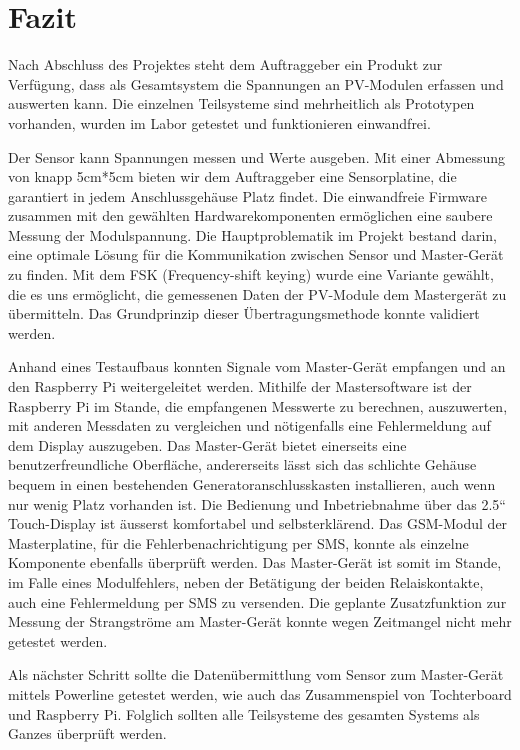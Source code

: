 \chapter{Fazit}
\label{chap:fazit}

Nach  Abschluss  des   Projektes  steht  dem  Auftraggeber   ein  Produkt  zur
Verf\"ugung, dass als  Gesamtsystem die Spannungen an  PV-Modulen erfassen und
auswerten  kann. Die einzelnen  Teilsysteme sind  mehrheitlich als  Prototypen
vorhanden, wurden im Labor getestet und funktionieren einwandfrei.

Der Sensor kann Spannungen messen  und Werte ausgeben. Mit einer Abmessung von
knapp 5cm*5cm bieten  wir dem Auftraggeber eine  Sensorplatine, die garantiert
in jedem  Anschlussgeh\"ause Platz findet. Die einwandfreie  Firmware zusammen
mit den gew\"ahlten Hardwarekomponenten erm\"oglichen eine saubere Messung der
Modulspannung. Die Hauptproblematik  im Projekt  bestand darin,  eine optimale
L\"osung  f\"ur  die  Kommunikation  zwischen  Sensor  und  Master-Ger\"at  zu
finden. Mit dem  FSK (Frequency-shift  keying) wurde eine  Variante gew\"ahlt,
die es uns erm\"oglicht, die  gemessenen Daten der PV-Module dem Masterger\"at
zu   \"ubermitteln. Das  Grundprinzip   dieser  \"Ubertragungsmethode   konnte
validiert werden.

Anhand  eines Testaufbaus  konnten  Signale vom  Master-Ger\"at empfangen  und
an  den  Raspberry  Pi   weitergeleitet  werden. Mithilfe  der  Mastersoftware
ist  der Raspberry  Pi  im  Stande, die  empfangenen  Messwerte zu  berechnen,
auszuwerten,  mit   anderen  Messdaten   zu  vergleichen   und  n\"otigenfalls
eine  Fehlermeldung  auf  dem Display  auszugeben. Das  Master-Ger\"at  bietet
einerseits  eine benutzerfreundliche  Oberfl\"ache, andererseits  l\"asst sich
das schlichte  Geh\"ause bequem in einen  bestehenden Generatoranschlusskasten
installieren,  auch   wenn  nur  wenig  Platz   vorhanden  ist. Die  Bedienung
und   Inbetriebnahme   \"uber   das   2.5``   Touch-Display   ist   \"ausserst
komfortabel und selbsterkl\"arend. Das GSM-Modul  der Masterplatine, f\"ur die
Fehlerbenachrichtigung  per  SMS,  konnte als  einzelne  Komponente  ebenfalls
\"uberpr\"uft werden. Das Master-Ger\"at  ist somit im Stande,  im Falle eines
Modulfehlers,  neben der  Bet\"atigung  der beiden  Relaiskontakte, auch  eine
Fehlermeldung per  SMS zu  versenden. Die geplante Zusatzfunktion  zur Messung
der  Strangstr\"ome  am  Master-Ger\"at  konnte wegen  Zeitmangel  nicht  mehr
getestet werden.

Als  n\"achster   Schritt  sollte  die  Daten\"ubermittlung   vom  Sensor  zum
Master-Ger\"at mittels  Powerline getestet werden, wie  auch das Zusammenspiel
von  Tochterboard  und Raspberry  Pi. Folglich  sollten  alle Teilsysteme  des
gesamten Systems als Ganzes \"uberpr\"uft werden.
